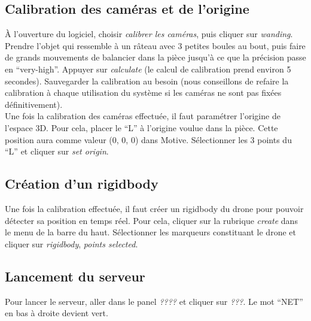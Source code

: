         \subsection{Calibration des caméras et de l'origine}
            À l'ouverture du logiciel, choisir \emph{calibrer les caméras}, puis cliquer sur \emph{wanding}. Prendre l'objet qui ressemble à un râteau avec 3 petites boules au bout, puis faire de grands mouvements de balancier dans la pièce jusqu'à ce que la précision passe en ``very-high''. Appuyer sur \emph{calculate} (le calcul de calibration prend environ 5 secondes). Sauvegarder la calibration au besoin (nous conseillons de refaire la calibration à chaque utilisation du système si les caméras ne sont pas fixées définitivement). \\

            Une fois la calibration des caméras effectuée, il faut paramétrer l'origine de l'espace 3D. Pour cela, placer le ``L'' à l'origine voulue dans la pièce. Cette position aura comme valeur (0, 0, 0) dans Motive. Sélectionner les 3 points du ``L'' et cliquer sur \emph{set origin}.

        \subsection{Création d'un rigidbody}
            Une fois la calibration effectuée, il faut créer un rigidbody du drone pour pouvoir détecter sa position en temps réel. Pour cela, cliquer sur la rubrique \emph{create} dans le menu de la barre du haut. Sélectionner les marqueurs constituant le drone et cliquer sur \emph{rigidbody}, \emph{points selected}.

        \subsection{Lancement du serveur}
            Pour lancer le serveur, aller dans le panel \emph{????} et cliquer sur \emph{???}. Le mot ``NET'' en bas à droite devient vert.



